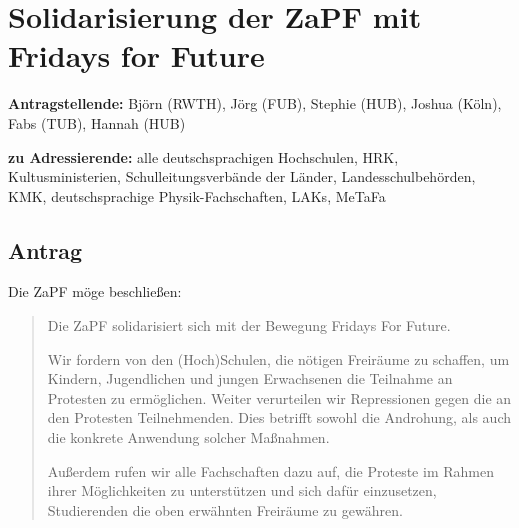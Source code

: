\documentclass[draft,10pt,oneside]{scrartcl}
\begin{document}
\section*{Solidarisierung der ZaPF mit Fridays for Future}

\textbf{Antragstellende:} Björn (RWTH), Jörg (FUB), Stephie (HUB), Joshua
(Köln), Fabs (TUB), Hannah (HUB)

\textbf{zu Adressierende:} alle deutschsprachigen Hochschulen, HRK,
Kultusministerien, Schulleitungsverbände der Länder, Landesschulbehörden, KMK,
deutschsprachige Physik-Fachschaften, LAKs, MeTaFa

\subsection*{Antrag}

Die ZaPF möge beschließen:

\begin{quote}
    Die ZaPF solidarisiert sich mit der Bewegung \glqq{}Fridays For
    Future\grqq{}.

    Wir fordern von den (Hoch)Schulen, die nötigen Freiräume zu schaffen, um
    Kindern, Jugendlichen und jungen Erwachsenen die Teilnahme an Protesten zu
    ermöglichen.  Weiter verurteilen wir Repressionen gegen die an den
    Protesten Teilnehmenden. Dies betrifft sowohl die Androhung, als auch die
    konkrete Anwendung solcher Maßnahmen.

    Außerdem rufen wir alle Fachschaften dazu auf, die Proteste im Rahmen ihrer
    Möglichkeiten zu unterstützen und sich dafür einzusetzen, Studierenden die
    oben erwähnten Freiräume zu gewähren.
\end{quote}
\end{document}
